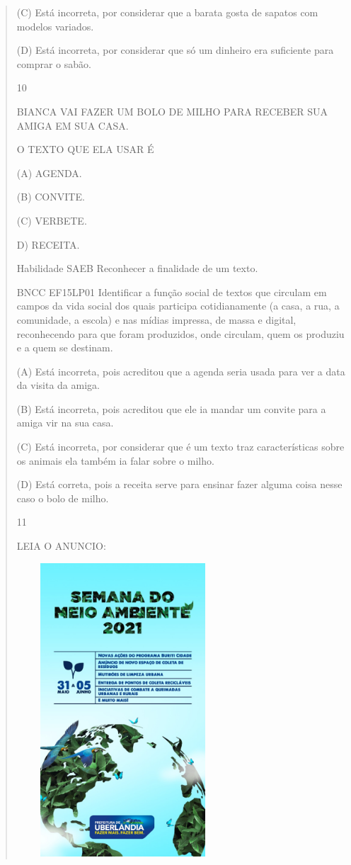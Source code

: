 {{{{\begin{verse}
{{\begin{escolha}
{{{{{(C) Está incorreta, por considerar que a barata gosta de sapatos com
modelos variados.

(D) Está incorreta, por considerar que só um dinheiro era suficiente
para comprar o sabão.

\num{10}

BIANCA VAI FAZER UM BOLO DE MILHO PARA RECEBER SUA AMIGA EM SUA CASA.

O TEXTO QUE ELA USAR É

(A) AGENDA.

(B) CONVITE.

(C) VERBETE.

D) RECEITA.

Habilidade SAEB Reconhecer a finalidade de um texto.

BNCC EF15LP01 Identificar a função social de textos que circulam em
campos da vida social dos quais participa cotidianamente (a casa, a rua,
a comunidade, a escola) e nas mídias impressa, de massa e digital,
reconhecendo para que foram produzidos, onde circulam, quem os produziu
e a quem se destinam.

(A) Está incorreta, pois acreditou que a agenda seria usada para ver a
data da visita da amiga.

(B) Está incorreta, pois acreditou que ele ia mandar um convite para a
amiga vir na sua casa.

(C) Está incorreta, por considerar que é um texto traz características
sobre os animais ela também ia falar sobre o milho.

(D) Está correta, pois a receita serve para ensinar fazer alguma coisa
nesse caso o bolo de milho.

\num{11}

LEIA O ANUNCIO:

\includegraphics[width=3.12674in,height=4.31210in]{media/image145.jpeg}

}}}}}
\end{escolha}}}
\end{verse}}}}}
